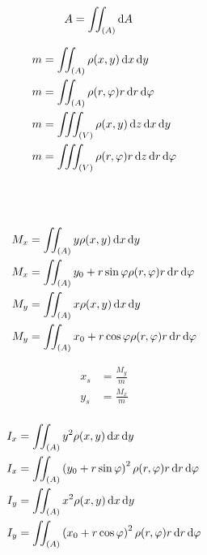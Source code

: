 \begin{boxleft}
\end{boxleft}\begin{boxrightshaded}
\begin{align*}
A&=\iint_{(A)}\mathop{}\!\mathrm{d} A
\end{align*}
\end{boxrightshaded}

\begin{boxleft}
\end{boxleft}\begin{boxrightshaded}
\begin{align*}
m&=\iint_{(A)}\rho(x,y)\diff x\diff y\\
m&=\iint_{(A)}\rho(r,\varphi)r\diff r\diff \varphi\\
m&=\iiint_{(V)}\rho(x,y)\diff z\diff x\diff y\\
m&=\iiint_{(V)}\rho(r,\varphi)r\diff z\diff r\diff \varphi
\end{align*}
\end{boxrightshaded}

\begin{boxleft}
\\
\\
\end{boxleft}\begin{boxrightshaded}
\begin{align*}
M_x&=\iint_{(A)}y\rho(x,y)\diff x\diff y\\
M_x&=\iint_{(A)}y_0+r\sin\varphi\rho(r,\varphi)r\diff r\diff \varphi\\
M_y&=\iint_{(A)}x\rho(x,y)\diff x\diff y\\
M_y&=\iint_{(A)}x_0+r\cos\varphi\rho(r,\varphi)r\diff r\diff \varphi
\end{align*}
\end{boxrightshaded}

\begin{boxleft}
\end{boxleft}\begin{boxrightshaded}
\begin{align*}
x_s&=\frac{M_y}{m}\\
y_s&=\frac{M_x}{m}\\
\end{align*}
\end{boxrightshaded}

\begin{boxleft}
\end{boxleft}\begin{boxrightshaded}
\begin{align*}
I_x&=\iint_{(A)}y^2\rho(x,y)\diff x\diff y\\
I_x&=\iint_{(A)}\left(y_0+r\sin\varphi\right)^2\rho(r,\varphi)r\diff r\diff \varphi\\
I_y&=\iint_{(A)}x^2\rho(x,y)\diff x\diff y\\
I_y&=\iint_{(A)}\left(x_0+r\cos\varphi\right)^2\rho(r,\varphi)r\diff r\diff \varphi
\end{align*}
\end{boxrightshaded}

